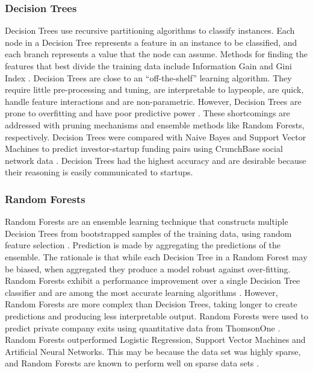 \documentclass[../thesis/thesis.tex]{subfiles}
\begin{document}
\begin{refsection}
\subsubsection{Decision Trees}

Decision Trees use recursive partitioning algorithms to classify instances. Each node in a Decision Tree represents a feature in an instance to be classified, and each branch represents a value that the node can assume. Methods for finding the features that best divide the training data include Information Gain and Gini Index \cite{kotsiantis2007}. Decision Trees are close to an ``off-the-shelf'' learning algorithm. They require little pre-processing and tuning, are interpretable to laypeople, are quick, handle feature interactions and are non-parametric. However, Decision Trees are prone to overfitting and have poor predictive power \cite{caruana2006}. These shortcomings are addressed with pruning mechanisms and ensemble methods like Random Forests, respectively. Decision Trees were compared with Naive Bayes and Support Vector Machines to predict investor-startup funding pairs using CrunchBase social network data \cite{liang2016}. Decision Trees had the highest accuracy and are desirable because their reasoning is easily communicated to startups.

\subsubsection{Random Forests}

Random Forests are an ensemble learning technique that constructs multiple Decision Trees from bootstrapped samples of the training data, using random feature selection \cite{breiman2001}. Prediction is made by aggregating the predictions of the ensemble. The rationale is that while each Decision Tree in a Random Forest may be biased, when aggregated they produce a model robust against over-fitting.  Random Forests exhibit a performance improvement over a single Decision Tree classifier and are among the most accurate learning algorithms \cite{caruana2006}.  However, Random Forests are more complex than Decision Trees, taking longer to create predictions and producing less interpretable output. Random Forests were used to predict private company exits using quantitative data from ThomsonOne \cite{bhat2011}. Random Forests outperformed Logistic Regression, Support Vector Machines and Artificial Neural Networks. This may be because the data set was highly sparse, and Random Forests are known to perform well on sparse data sets \cite{breiman2001}.


\end{refsection}
\end{document}
